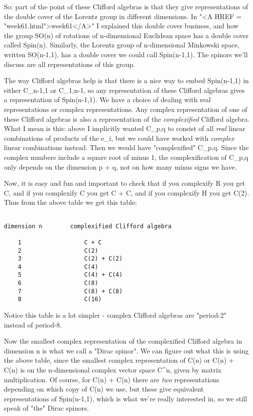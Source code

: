 So: part of the point of these Clifford algebras is that they give 
representations of the double cover of the Lorentz group in different
dimensions.  In "<A HREF = "week61.html">week61</A>" I explained this double cover business,
and how the group SO(n) of rotations of n-dimensional Euclidean space 
has a double cover called Spin(n).  Similarly, the Lorentz group
of n-dimensional Minkowski space, written SO(n-1,1), has a double cover 
we could call Spin(n-1,1).  The spinors we'll discuss are all 
representations of this group.  

The way Clifford algebras help is that there is a nice way to
embed Spin(n-1,1) in either C_{n-1,1} or C_{1,n-1}, so any 
representation of these Clifford algebras gives a representation
of Spin(n-1,1).   We have a choice of dealing with real representations or 
complex representations.  Any complex representation of one of
these Clifford algebras is also a representation of the \emph{complexified} 
Clifford algebra.   What I mean is this: above I implicitly wanted
C_{p,q} to consist of all \emph{real} linear combinations of products of 
the e_{i}, but we could have worked with \emph{complex} linear combinations 
instead.  Then we would have "complexified" C_{p,q}.  
Since the
complex numbers include a square root of minus 1, the complexification
of C_{p,q} only depends on the dimension p + q, not on how many minus 
signs we have. 

Now, it is easy and fun and important to check that if you complexify R 
you get C, and if you complexify C you get C + C, and if you complexify 
H you get C(2).  Thus from the above table we get this table: 


\begin{verbatim}

dimension n        complexified Clifford algebra

    1                  C + C
    2                  C(2)
    3                  C(2) + C(2)
    4                  C(4)
    5                  C(4) + C(4)
    6                  C(8)
    7                  C(8) + C(8)
    8                  C(16)

\end{verbatim}
    
Notice this table is a lot simpler - complex Clifford algebras
are "period-2" instead of period-8.  

Now the smallest complex representation of the complexified Clifford
algebra in dimension n is what we call a "Dirac spinor".  We can figure
out what this is using the above table, since the smallest complex 
representation of C(n) or C(n) + C(n) is on the n-dimensional complex
vector space C^{n}, given by matrix multiplication.  Of course, for 
C(n) + C(n) there are \emph{two} representations depending on which copy 
of C(n) we use, but these give equivalent representations of Spin(n-1,1), 
which is what we're really interested in, so we still speak of "the" 
Dirac spinors.

